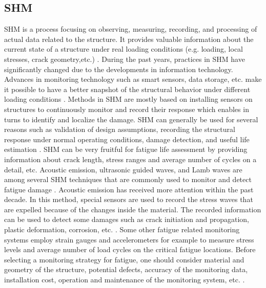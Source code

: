 \subsection{SHM}
\noindent
SHM is a process focusing on observing, measuring, recording, and processing of actual data related to the structure. It provides valuable information about the current state of a structure
under real loading conditions (e.g. loading, local stresses, crack geometry,etc.) \citep{Cremona2018}. During the past years, practices in SHM have significantly changed due to the developments 
in information technology. Advances in monitoring 
technology such as smart sensors, data storage, etc. make it possible to have a better snapshot of the structural behavior under different loading conditions \citep{Cai2016BigDA}. Methods in SHM 
are mostly based on installing sensors on structures 
to continuously monitor and record their response which enables in turns to identify and localize the damage. SHM can generally be used for several reasons such as validation of design assumptions, recording 
the structural response under normal operating conditions, damage detection, and useful life estimation \citep{Zhu2013, ZHU20131836}. SHM can be very fruitful for fatigue life assessment by providing information 
about crack length, stress ranges and average number of cycles on a detail, etc. Acoustic emission, ultrasonic guided waves, and Lamb waves are among several SHM techniques that are commonly used to 
monitor and detect fatigue damage \citep{Ciang2008}. Acoustic emission has received more attention within the past decade. In this method, special sensors are used to record 
the stress waves that are expelled because of the changes inside the material. The recorded information can be used to detect some damages such as crack initiation and propagation, plastic deformation,
corrosion, etc. \citep{Anastasopoulos2009}. Some other fatigue related monitoring systems employ strain gauges and accelerometers for example to measure stress levels and average number of load 
cycles on the critical fatigue locations. Before selecting a monitoring strategy for fatigue, one should consider material and geometry of the structure, potential defects, accuracy of the monitoring 
data, installation cost, operation and maintenance of the monitoring system, etc. \citep{SOLIMAN201691}. 

